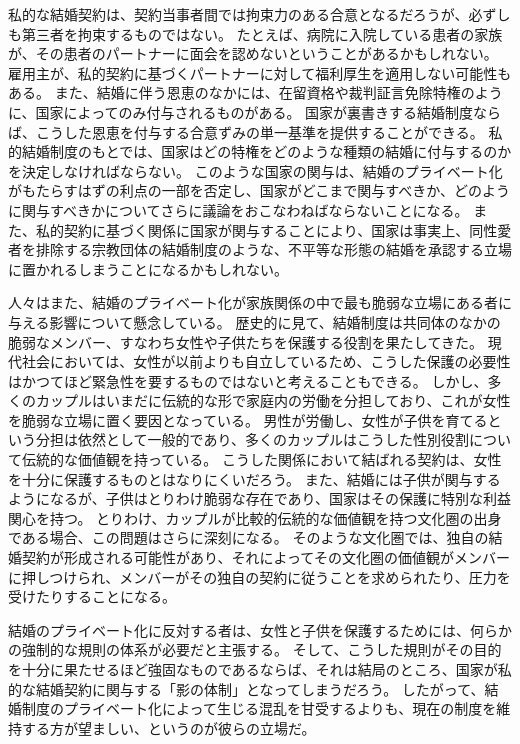 \documentclass[paper=a4,book,openany]{jlreq}
\begin{document}
私的な結婚契約は、契約当事者間では拘束力のある合意となるだろうが、必ずしも第三者を拘束するものではない。
たとえば、病院に入院している患者の家族が、その患者のパートナーに面会を認めないということがあるかもしれない。
雇用主が、私的契約に基づくパートナーに対して福利厚生を適用しない可能性もある。
また、結婚に伴う恩恵のなかには、在留資格や裁判証言免除特権のように、国家によってのみ付与されるものがある。
国家が裏書きする結婚制度ならば、こうした恩恵を付与する合意ずみの単一基準を提供することができる。
私的結婚制度のもとでは、国家はどの特権をどのような種類の結婚に付与するのかを決定しなければならない。
このような国家の関与は、結婚のプライベート化がもたらすはずの利点の一部を否定し、国家がどこまで関与すべきか、どのように関与すべきかについてさらに議論をおこなわねばならないことになる。
また、私的契約に基づく関係に国家が関与することにより、国家は事実上、同性愛者を排除する宗教団体の結婚制度のような、不平等な形態の結婚を承認する立場に置かれるしまうことになるかもしれない。

人々はまた、結婚のプライベート化が家族関係の中で最も脆弱な立場にある者に与える影響について懸念している。
歴史的に見て、結婚制度は共同体のなかの脆弱なメンバー、すなわち女性や子供たちを保護する役割を果たしてきた。
現代社会においては、女性が以前よりも自立しているため、こうした保護の必要性はかつてほど緊急性を要するものではないと考えることもできる。
しかし、多くのカップルはいまだに伝統的な形で家庭内の労働を分担しており、これが女性を脆弱な立場に置く要因となっている。
男性が労働し、女性が子供を育てるという分担は依然として一般的であり、多くのカップルはこうした性別役割について伝統的な価値観を持っている。
こうした関係において結ばれる契約は、女性を十分に保護するものとはなりにくいだろう。
また、結婚には子供が関与するようになるが、子供はとりわけ脆弱な存在であり、国家はその保護に特別な利益関心を持つ。
とりわけ、カップルが比較的伝統的な価値観を持つ文化圏の出身である場合、この問題はさらに深刻になる。
そのような文化圏では、独自の結婚契約が形成される可能性があり、それによってその文化圏の価値観がメンバーに押しつけられ、メンバーがその独自の契約に従うことを求められたり、圧力を受けたりすることになる。

結婚のプライベート化に反対する者は、女性と子供を保護するためには、何らかの強制的な規則の体系が必要だと主張する。
そして、こうした規則がその目的を十分に果たせるほど強固なものであるならば、それは結局のところ、国家が私的な結婚契約に関与する「影の体制」となってしまうだろう。
したがって、結婚制度のプライベート化によって生じる混乱を甘受するよりも、現在の制度を維持する方が望ましい、というのが彼らの立場だ\citep[p.204]{hartley12:_polit_liber_marriag_famil}。
\end{document}
